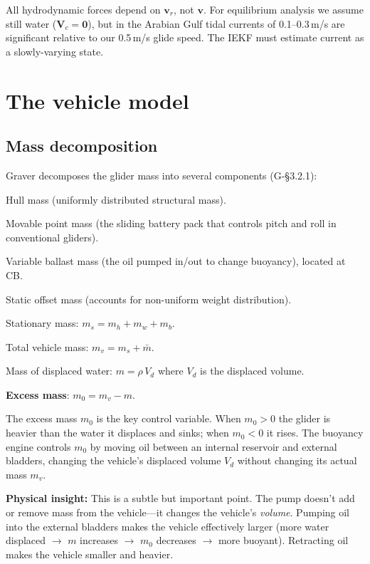 \documentclass[11pt,a4paper]{article}
\newcommand{\vect}[1]{\bm{#1}}
\newcommand{\insight}[1]{\par\smallskip\noindent\colorbox{green!8}{\parbox{\dimexpr\linewidth-2\fboxsep}{%
  \small\textbf{Physical insight:} #1}}\smallskip}
\begin{document}
All hydrodynamic forces depend on $\vect{v}_r$, not $\vect{v}$.  For equilibrium
analysis we assume still water ($\vect{V}_c=\vect{0}$), but in the Arabian Gulf
tidal currents of 0.1--0.3\,m/s are significant relative to our 0.5\,m/s glide speed.
The IEKF must estimate current as a slowly-varying state.


\section{The vehicle model}
\label{sec:vehicle}

\subsection{Mass decomposition}

Graver decomposes the glider mass into several components (G-\S3.2.1):

\begin{description}[nosep]
  \item[$m_h$:] Hull mass (uniformly distributed structural mass).
  \item[$\bar{m}$:] Movable point mass (the sliding battery pack that controls
    pitch and roll in conventional gliders).
  \item[$m_b$:] Variable ballast mass (the oil pumped in/out to change buoyancy),
    located at CB.
  \item[$m_w$:] Static offset mass (accounts for non-uniform weight distribution).
  \item[$m_s$:] Stationary mass: $m_s = m_h + m_w + m_b$.
  \item[$m_v$:] Total vehicle mass: $m_v = m_s + \bar{m}$.
  \item[$m$:] Mass of displaced water: $m = \rho\,V_d$ where $V_d$ is the
    displaced volume.
  \item[$m_0$:] \textbf{Excess mass}: $m_0 = m_v - m$.
\end{description}

The excess mass $m_0$ is the key control variable.  When $m_0 > 0$ the glider is
heavier than the water it displaces and sinks; when $m_0 < 0$ it rises.  The buoyancy
engine controls $m_0$ by moving oil between an internal reservoir and external bladders,
changing the vehicle's displaced volume $V_d$ without changing its actual mass $m_v$.

\insight{This is a subtle but important point.  The pump doesn't add or remove mass
from the vehicle---it changes the vehicle's \emph{volume}.  Pumping oil into the external
bladders makes the vehicle effectively larger (more water displaced $\rightarrow$ $m$
increases $\rightarrow$ $m_0$ decreases $\rightarrow$ more buoyant).  Retracting oil
makes the vehicle smaller and heavier.}
\end{document}
